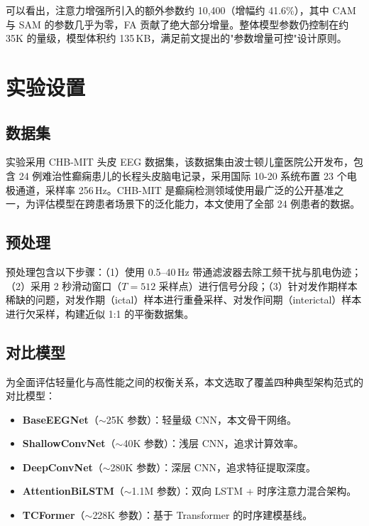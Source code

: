 \documentclass[12pt, a4paper]{article}
\begin{document}
可以看出，注意力增强所引入的额外参数约 10,400（增幅约 41.6\%），其中 CAM 与 SAM 的参数几乎为零，FA 贡献了绝大部分增量。整体模型参数仍控制在约 35K 的量级，模型体积约 135\,KB，满足前文提出的"参数增量可控"设计原则。

\section{实验设置}

\subsection{数据集}

实验采用 CHB-MIT 头皮 EEG 数据集\cite{ref_shoeb2009,ref_goldberger2000}，该数据集由波士顿儿童医院公开发布，包含 24 例难治性癫痫患儿的长程头皮脑电记录，采用国际 10-20 系统布置 23 个电极通道，采样率 256\,Hz。CHB-MIT 是癫痫检测领域使用最广泛的公开基准之一\cite{ref_ali2024}，为评估模型在跨患者场景下的泛化能力，本文使用了全部 24 例患者的数据。

\subsection{预处理}

预处理包含以下步骤：（1）使用 0.5--40\,Hz 带通滤波器去除工频干扰与肌电伪迹；（2）采用 2 秒滑动窗口（$T=512$ 采样点）进行信号分段；（3）针对发作期样本稀缺的问题，对发作期（ictal）样本进行重叠采样、对发作间期（interictal）样本进行欠采样，构建近似 1:1 的平衡数据集。

\subsection{对比模型}

为全面评估轻量化与高性能之间的权衡关系，本文选取了覆盖四种典型架构范式的对比模型：

\begin{itemize}[leftmargin=2.2em]
\item \textbf{BaseEEGNet}\cite{ref_lawhern2018}（$\sim$25K 参数）：轻量级 CNN，本文骨干网络。
\item \textbf{ShallowConvNet}\cite{ref_schirrmeister2017}（$\sim$40K 参数）：浅层 CNN，追求计算效率。
\item \textbf{DeepConvNet}\cite{ref_schirrmeister2017}（$\sim$280K 参数）：深层 CNN，追求特征提取深度。
\item \textbf{AttentionBiLSTM}\cite{ref_tsiouris2018}（$\sim$1.1M 参数）：双向 LSTM + 时序注意力混合架构。
\item \textbf{TCFormer}（$\sim$228K 参数）：基于 Transformer\cite{ref_vaswani2017} 的时序建模基线。
\end{itemize}
\end{document}
